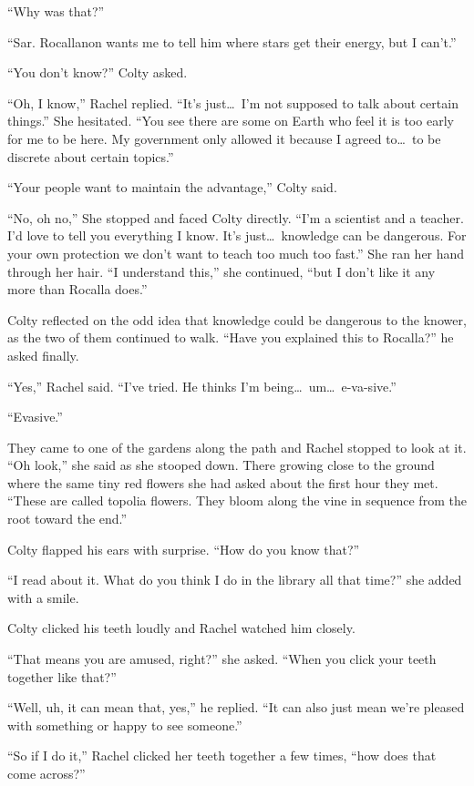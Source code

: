 ``Why was that?''

``Sar. Rocallanon wants me to tell him where stars get their energy, but I can't.''

``You don't know?'' Colty asked.

``Oh, I know,'' Rachel replied. ``It's just\ldots\ I'm not supposed to talk about certain
things.'' She hesitated. ``You see there are some on Earth who feel it is too early for me to be
here. My government only allowed it because I agreed to\ldots\ to be discrete about certain
topics.''

``Your people want to maintain the advantage,'' Colty said.

``No, oh no,'' She stopped and faced Colty directly. ``I'm a scientist and a teacher. I'd love
to tell you everything I know. It's just\ldots\ knowledge can be dangerous. For your own
protection we don't want to teach too much too fast.'' She ran her hand through her hair. ``I
understand this,'' she continued, ``but I don't like it any more than Rocalla does.''

Colty reflected on the odd idea that knowledge could be dangerous to the knower, as the two of
them continued to walk. ``Have you explained this to Rocalla?'' he asked finally.

``Yes,'' Rachel said. ``I've tried. He thinks I'm being\ldots\ um\ldots\ e-va-sive.''

``Evasive.''

They came to one of the gardens along the path and Rachel stopped to look at it. ``Oh look,''
she said as she stooped down. There growing close to the ground where the same tiny red flowers
she had asked about the first hour they met. ``These are called topolia flowers. They bloom
along the vine in sequence from the root toward the end.''

Colty flapped his ears with surprise. ``How do you know that?''

``I read about it. What do you think I do in the library all that time?'' she added with a
smile.

Colty clicked his teeth loudly and Rachel watched him closely.

``That means you are amused, right?'' she asked. ``When you click your teeth together like
that?''

``Well, uh, it can mean that, yes,'' he replied. ``It can also just mean we're pleased with
something or happy to see someone.''

``So if I do it,'' Rachel clicked her teeth together a few times, ``how does that come across?''

